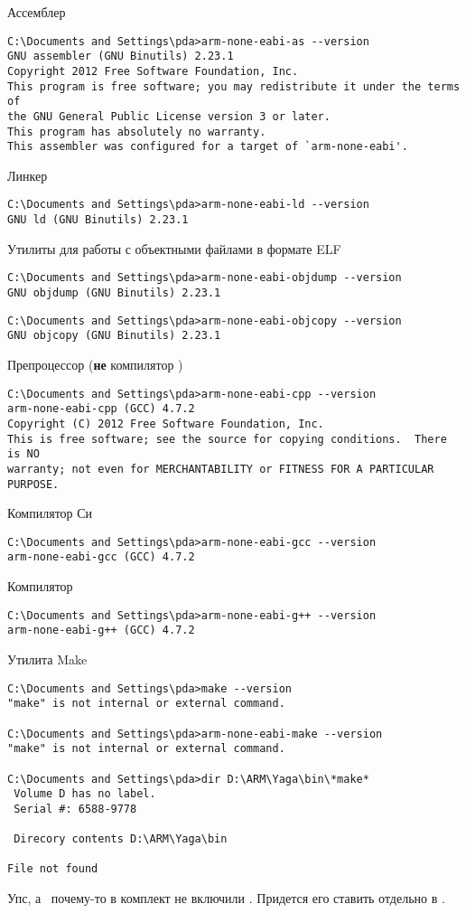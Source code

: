 \bigskip Ассемблер
\begin{lstlisting}[style=con]
C:\Documents and Settings\pda>arm-none-eabi-as --version
GNU assembler (GNU Binutils) 2.23.1
Copyright 2012 Free Software Foundation, Inc.
This program is free software; you may redistribute it under the terms of
the GNU General Public License version 3 or later.
This program has absolutely no warranty.
This assembler was configured for a target of `arm-none-eabi'. 
\end{lstlisting}
\bigskip Линкер
\begin{lstlisting}[style=con]
C:\Documents and Settings\pda>arm-none-eabi-ld --version
GNU ld (GNU Binutils) 2.23.1
\end{lstlisting}
\bigskip Утилиты для работы с объектными файлами в формате ELF
\begin{lstlisting}[style=con]
C:\Documents and Settings\pda>arm-none-eabi-objdump --version
GNU objdump (GNU Binutils) 2.23.1
\end{lstlisting}
\begin{lstlisting}[style=con]
C:\Documents and Settings\pda>arm-none-eabi-objcopy --version
GNU objcopy (GNU Binutils) 2.23.1
\end{lstlisting}
\bigskip Препроцессор (\textbf{не} компилятор \cpp)
\begin{lstlisting}[style=con]
C:\Documents and Settings\pda>arm-none-eabi-cpp --version
arm-none-eabi-cpp (GCC) 4.7.2
Copyright (C) 2012 Free Software Foundation, Inc.
This is free software; see the source for copying conditions.  There is NO
warranty; not even for MERCHANTABILITY or FITNESS FOR A PARTICULAR PURPOSE.
\end{lstlisting}
\bigskip Компилятор Си
\begin{lstlisting}[style=con]
C:\Documents and Settings\pda>arm-none-eabi-gcc --version
arm-none-eabi-gcc (GCC) 4.7.2
\end{lstlisting}
\bigskip Компилятор \cpp
\begin{lstlisting}[style=con]
C:\Documents and Settings\pda>arm-none-eabi-g++ --version
arm-none-eabi-g++ (GCC) 4.7.2
\end{lstlisting}

\bigskip Утилита Make
\begin{lstlisting}[style=con]
C:\Documents and Settings\pda>make --version
"make" is not internal or external command.

C:\Documents and Settings\pda>arm-none-eabi-make --version
"make" is not internal or external command.

C:\Documents and Settings\pda>dir D:\ARM\Yaga\bin\*make*
 Volume D has no label.
 Serial #: 6588-9778

 Direcory contents D:\ARM\Yaga\bin

File not found
\end{lstlisting}

\bigskip Упс, а \make\ почему-то в комплект не включили \frownie.
Придется его ставить отдельно в .


